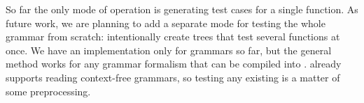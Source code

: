 

So far the only mode of operation is generating test cases for a
single function.
As future work, we are planning to add a separate
mode for testing the whole grammar from scratch: intentionally create
trees that test several functions at once.
We have an implementation only for \gf{} grammars so far, but the
general method works for any grammar formalism that can be compiled
into \pmcfg{}. \gf{} already supports reading context-free grammars,
so testing any existing \cfg{} is a matter of some preprocessing.
